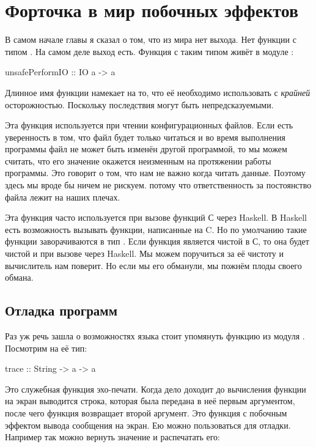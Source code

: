 \section{Форточка в мир побочных эффектов}

В самом начале главы я сказал о том, что из мира   
нет выхода. Нет функции с типом . На самом
деле выход есть. Функция с таким типом живёт в модуле 
:

\begin{code}
unsafePerformIO :: IO a -> a
\end{code}

Длинное имя функции намекает на то, что её необходимо
использовать с \emph{крайней} осторожностью. Поскольку
последствия могут быть непредсказуемыми. 

Эта функция используется при чтении конфигурационных файлов.
Если есть уверенность в том, что файл будет только читаться
и во время выполнения программы файл не может быть изменён 
другой программой, то мы можем считать, что его значение окажется
неизменным на протяжении работы программы. Это говорит о том, что 
нам не важно когда читать данные. Поэтому здесь мы вроде бы
ничем не рискуем.  потому что ответственность
за постоянство файла лежит на наших плечах. 

Эта функция часто используется при вызове функций С через
Haskell. В Haskell есть возможность вызывать функции,
написанные на C. Но по умолчанию такие функции заворачиваются
в тип . Если функция является
чистой в С, то она будет чистой и при вызове через Haskell. 
Мы можем поручиться за её чистоту и вычислитель нам поверит.
Но если мы его обманули, мы пожнём плоды своего обмана.

\subsection{Отладка программ}

Раз уж речь зашла о  возможностях 
языка стоит упомянуть функцию  из модуля
. Посмотрим на её тип:

\begin{code}
trace :: String -> a -> a
\end{code}

Это служебная функция эхо-печати. Когда дело доходит до вычисления 
функции  на экран выводится строка, которая была передана
в неё первым аргументом, после чего функция возвращает второй аргумент.
Это функция  с побочным эффектом вывода сообщения на экран.
Ею можно пользоваться для отладки. Например так можно вернуть
значение и распечатать его:

